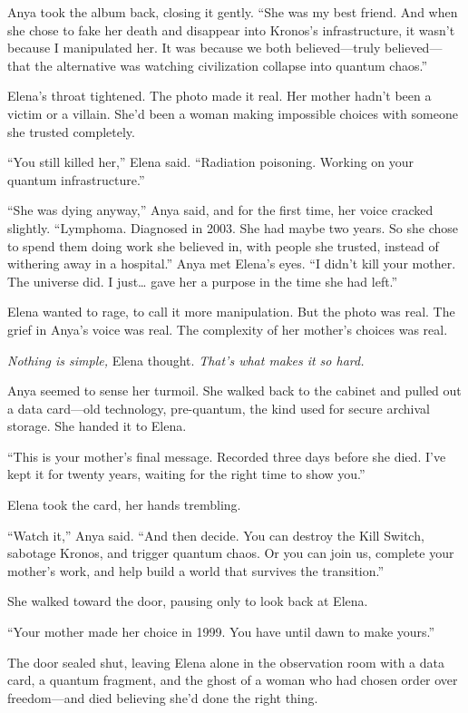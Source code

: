 \documentclass[12pt,letterpaper]{book}
\begin{document}
Anya took the album back, closing it gently. ``She was my best friend. And when she chose to fake her death and disappear into Kronos's infrastructure, it wasn't because I manipulated her. It was because we both believed---truly believed---that the alternative was watching civilization collapse into quantum chaos.''

Elena's throat tightened. The photo made it real. Her mother hadn't been a victim or a villain. She'd been a woman making impossible choices with someone she trusted completely.

``You still killed her,'' Elena said. ``Radiation poisoning. Working on your quantum infrastructure.''

``She was dying anyway,'' Anya said, and for the first time, her voice cracked slightly. ``Lymphoma. Diagnosed in 2003. She had maybe two years. So she chose to spend them doing work she believed in, with people she trusted, instead of withering away in a hospital.'' Anya met Elena's eyes. ``I didn't kill your mother. The universe did. I just\ldots{} gave her a purpose in the time she had left.''

Elena wanted to rage, to call it more manipulation. But the photo was real. The grief in Anya's voice was real. The complexity of her mother's choices was real.

\emph{Nothing is simple,} Elena thought. \emph{That's what makes it so hard.}

Anya seemed to sense her turmoil. She walked back to the cabinet and pulled out a data card---old technology, pre-quantum, the kind used for secure archival storage. She handed it to Elena.

``This is your mother's final message. Recorded three days before she died. I've kept it for twenty years, waiting for the right time to show you.''

Elena took the card, her hands trembling.

``Watch it,'' Anya said. ``And then decide. You can destroy the Kill Switch, sabotage Kronos, and trigger quantum chaos. Or you can join us, complete your mother's work, and help build a world that survives the transition.''

She walked toward the door, pausing only to look back at Elena.

``Your mother made her choice in 1999. You have until dawn to make yours.''

The door sealed shut, leaving Elena alone in the observation room with a data card, a quantum fragment, and the ghost of a woman who had chosen order over freedom---and died believing she'd done the right thing.
\end{document}
